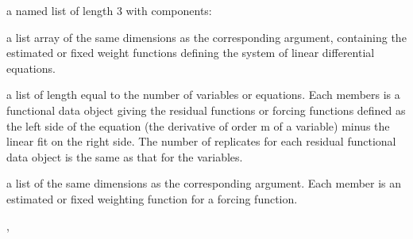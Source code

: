 \documentclass{article}
\begin{document}
\begin{Value}
a named list of length 3 with components:

\begin{ldescription}
\item[\code{bwtlist}] a list array of the same dimensions as the
corresponding argument, containing the estimated or fixed weight
functions defining the system of linear differential equations.

\item[\code{resfdlist}] a list of length equal to the number of variables
or equations.  Each members is a functional data object giving the
residual functions or forcing functions defined as the left side
of the equation (the derivative of order m of a variable) minus
the linear fit on the right side.  The number of replicates for each
residual functional data object is the same as that for the variables.

\item[\code{awtlist}] a list of the same dimensions as the corresponding
argument.  Each member is an estimated or fixed weighting function for
a forcing function.

\end{ldescription}
\end{Value}
\begin{SeeAlso}\relax
{}, 
\end{SeeAlso}
\end{document}
